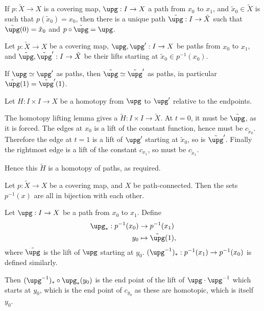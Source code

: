 \documentclass[12pt]{article}
\begin{document}
\begin{corollary}
	If $p : \tilde X \to X$ is a covering map,  $\upg : I \to X$ a path from $x_0$ to $x_1$, and $\tilde x_0 \in \tilde X$ is such that $p(\tilde x_0) = x_0$, then there is a unique path $\tilde \upg : I \to \tilde X$ such that $\tilde \upg(0) = \tilde x_0$ and $p \circ \tilde \upg = \upg$.
\end{corollary}

\begin{corollary}
	Let $p : \tilde X \to X$ be a covering map, $\upg, \upg' : I \to X$ be paths from $x_0$ to $x_1$, and $\tilde \upg, \tilde \upg' : I \to \tilde X$ be their lifts starting at $\tilde x_0 \in p^{-1}(x_0)$.

	If $\upg \simeq \upg'$ as paths, then $\tilde\upg \simeq \tilde\upg'$ as paths, in particular $\tilde \upg(1) = \tilde \upg'(1)$.
\end{corollary}

\begin{proofbox}
	Let $H : I \times I \to X$ be a homotopy from $\upg$ to $\upg'$ relative to the endpoints.

	The homotopy lifting lemma gives a $\tilde H : I \times I \to \tilde X$. At $t = 0$, it must be $\tilde \upg$, as it is forced. The edges at $x_0$ is a lift of the constant function, hence must be $c_{\tilde x_0}$. Therefore the edge at $t = 1$ is a lift of $\upg'$ starting at $\tilde x_0$, so is $\tilde \upg'$. Finally the rightmost edge is a lift of the constant $c_{x_1}$, so must be $c_{\tilde x_1}$.

	Hence this $\tilde H$ is a homotopy of paths, as required.
\end{proofbox}

\begin{corollary}
	Let $p : \tilde X \to X$ be a covering map, and $X$ be path-connected. Then the sets $p^{-1}(x)$ are all in bijection with each other.
\end{corollary}

\begin{proofbox}
	Let $\upg : I \to X$ be a path from $x_0$ to $x_1$. Define
	\begin{align*}
		\upg_\ast : p^{-1}(x_0) &\to p^{-1}(x_1) \\
		y_0 &\mapsto \tilde \upg(1),
	\end{align*}
	where $\tilde \upg$ is the lift of $\upg$ starting at $y_0$. $(\upg^{-1})_\ast : p^{-1}(x_1) \to p^{-1}(x_0)$ is defined similarly.

	Then $(\upg^{-1})_\ast \circ \upg_\ast (y_0)$ is the end point of the lift of $\upg \cdot \upg^{-1}$ which starts at $y_0$, which is the end point of $c_{y_0}$ as these are homotopic, which is itself $y_0$.
\end{proofbox}
\end{document}
